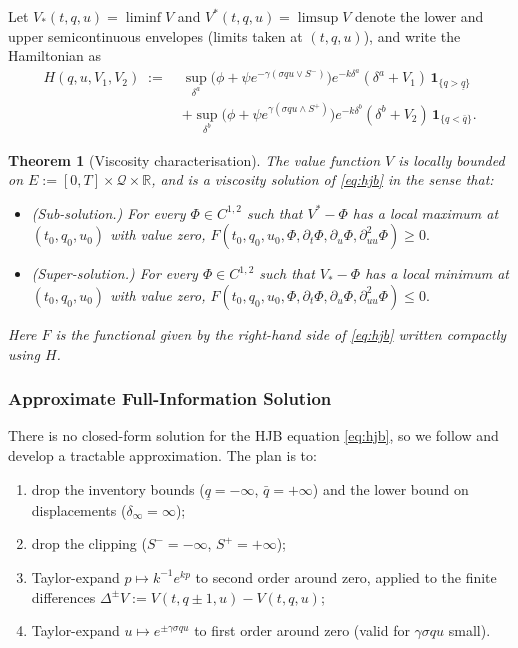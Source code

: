 \documentclass[11pt,a4paper]{article}
\theoremstyle{plain}
\newtheorem{theorem}{Theorem}[section]
\theoremstyle{definition}
\newcommand{\R}{\mathbb{R}}
\begin{document}
Let $V_*(t,q,u) = \liminf V$ and $V^*(t,q,u) = \limsup V$ denote the
lower and upper semicontinuous envelopes (limits taken at $(t,q,u)$), and
write the Hamiltonian as
\begin{equation}
\label{eq:hamiltonian}
\begin{aligned}
  H(q,u,V_1,V_2) \;:=\;
   &\sup_{\delta^a}\bigl(\phi + \psi e^{-\gamma(\sigma q u\vee S^-)}\bigr)
      e^{-k\delta^a}(\delta^a+V_1)\,\mathbf{1}_{\{q>\underline{q}\}}\\
   &+ \sup_{\delta^b}\bigl(\phi + \psi e^{\gamma(\sigma q u\wedge S^+)}\bigr)
      e^{-k\delta^b}(\delta^b+V_2)\,\mathbf{1}_{\{q<\bar{q}\}}.
\end{aligned}
\end{equation}

\begin{theorem}[Viscosity characterisation]
\label{thm:viscosity}
The value function $V$ is locally bounded on $E:=[0,T]\times\mathcal{Q}\times\R$,
and is a viscosity solution of \eqref{eq:hjb} in the sense that:
\begin{itemize}[noitemsep]
  \item (Sub-solution.) For every $\Phi\in C^{1,2}$ such that
        $V^*-\Phi$ has a local maximum at $(t_0,q_0,u_0)$ with value zero,
        \(F(t_0,q_0,u_0,\Phi,\partial_t\Phi,\partial_u\Phi,\partial^2_{uu}\Phi)\ge 0.\)
  \item (Super-solution.) For every $\Phi\in C^{1,2}$ such that
        $V_*-\Phi$ has a local minimum at $(t_0,q_0,u_0)$ with value zero,
        \(F(t_0,q_0,u_0,\Phi,\partial_t\Phi,\partial_u\Phi,\partial^2_{uu}\Phi)\le 0.\)
\end{itemize}
Here $F$ is the functional given by the right-hand side of
\eqref{eq:hjb} written compactly using $H$.
\end{theorem}



\subsubsection{Approximate Full-Information Solution}

There is no closed-form solution for the HJB equation \eqref{eq:hjb}, so
we follow \cite{bergault2018closed,barucci2025market} and develop a
tractable approximation. The plan is to:
\begin{enumerate}[label=(\roman*),noitemsep]
  \item drop the inventory bounds ($\underline{q}=-\infty$,
        $\bar{q}=+\infty$) and the lower bound on displacements
        ($\delta_\infty=\infty$);
  \item drop the clipping ($S^-=-\infty$, $S^+=+\infty$);
  \item Taylor-expand $p\mapsto k^{-1}e^{kp}$ to second order around zero,
        applied to the finite differences
        $\Delta^\pm V := V(t,q\pm 1,u)-V(t,q,u)$;
  \item Taylor-expand $u\mapsto e^{\pm\gamma\sigma q u}$ to first order
        around zero (valid for $\gamma\sigma q u$ small).
\end{enumerate}
\end{document}
